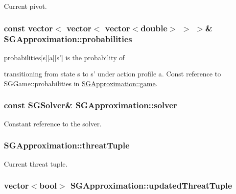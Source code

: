 Current pivot. \hypertarget{classSGApproximation_a82aefba3c77e331995e53b6692af4ada}{
\subsubsection[{probabilities}]{\setlength{\rightskip}{0pt plus 5cm}const vector$<$ vector$<$ vector$<$double$>$ $>$ $>$\& S\-G\-Approximation\-::probabilities\hspace{0.3cm}{\ttfamily [private]}}}\label{classSGApproximation_a82aefba3c77e331995e53b6692af4ada}
\begin{DoxyVerb}      probabilities[s][a][s'] is the probability of
\end{DoxyVerb}
 transitioning from state s to s' under action profile a. Const reference to S\-G\-Game\-::probabilities in \hyperlink{classSGApproximation_a3244a3d7de5f2b909d438f5b4ab337ee}{S\-G\-Approximation\-::game}. \hypertarget{classSGApproximation_a0f3be9758c5ee97b4fafd7d15e9f3c88}{
\subsubsection[{solver}]{\setlength{\rightskip}{0pt plus 5cm}const {\bf S\-G\-Solver}\& S\-G\-Approximation\-::solver\hspace{0.3cm}{\ttfamily [private]}}}\label{classSGApproximation_a0f3be9758c5ee97b4fafd7d15e9f3c88}
Constant reference to the solver. \hypertarget{classSGApproximation_aee3bab15aee351f8a543df2799f2c9f6}{
\subsubsection[{threat\-Tuple}]{ S\-G\-Approximation\-::threat\-Tuple\hspace{0.3cm}{\ttfamily [private]}}}\label{classSGApproximation_aee3bab15aee351f8a543df2799f2c9f6}
Current threat tuple. \hypertarget{classSGApproximation_afb83095fff0f02df719ed3654abab5a8}{
\subsubsection[{updated\-Threat\-Tuple}]{\setlength{\rightskip}{0pt plus 5cm}vector$<$bool$>$ S\-G\-Approximation\-::updated\-Threat\-Tuple\hspace{0.3cm}{\ttfamily [private]}}}\label{classSGApproximation_afb83095fff0f02df719ed3654abab5a8}
